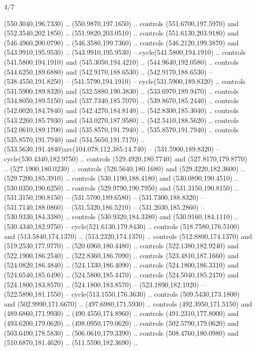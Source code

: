 \begin{flagdescription}{4/7}
\begin{scope}[shift={(0.5\flaglength,0.5\flagwidth)},scale=\flagwidth*\stretchfactor/820]
\begin{scope}[scale=1.87,xshift=-138mm,yshift=75mm]
\begin{scope}[y=0.8pt, x=0.8pt, yscale=-1, xscale=1]
\begin{scope}[fill=cd2a567]
  (550.3040,196.7330) .. (550.9870,197.1650) .. controls (551.6700,197.5970) and
  (552.3540,202.1850) .. (551.9820,203.0510) .. controls (551.6130,203.9180) and
  (546.4960,200.0790) .. (546.3580,199.7360) .. controls (546.2120,199.3870) and
  (543.9910,195.9530) .. (543.9910,195.9530) -- cycle(541.5800,194.1910) ..
  controls (541.5800,194.1910) and (545.3050,194.4210) .. (544.9640,192.0580) ..
  controls (544.6250,189.6880) and (542.9170,188.6530) .. (542.9170,188.6530) --
  (538.4550,191.8250) -- (541.5790,194.1910) -- cycle(531.5900,189.8320) ..
  controls (531.5900,189.8320) and (532.5880,190.3830) .. (533.6970,189.9470) ..
  controls (534.8050,189.5150) and (537.7340,185.7070) .. (539.8670,185.2440) ..
  controls (542.0020,184.7840) and (542.4270,184.8140) .. (542.8300,185.3040) ..
  controls (543.2260,185.7930) and (543.0270,187.9580) .. (542.5410,188.5620) ..
  controls (542.0610,189.1700) and (535.8570,191.7940) .. (535.8570,191.7940) ..
  controls (535.8570,191.7940) and (534.5650,191.7170) ..
  (533.5630,191.4840)arc(104.078:112.385:14.740) -- (531.5900,189.8320) --
  cycle(530.4340,182.9750) .. controls (529.4920,180.7740) and
  (527.8170,179.8770) .. (527.1900,180.0230) .. controls (526.5640,180.1680) and
  (529.3220,182.3600) .. (529.7200,185.3910) .. controls (530.1190,188.4180) and
  (530.0890,190.4510) .. (530.0350,190.6250) .. controls (529.9790,190.7950) and
  (531.3150,190.8150) .. (531.3150,190.8150) -- (531.5700,189.6580) --
  (531.7300,188.8320) -- (531.7140,188.0860) -- (531.5320,186.5210) --
  (531.2030,185.2860) -- (530.9330,184.3380) .. controls (530.9320,184.3380) and
  (530.9160,184.1110) .. (530.4340,182.9750) -- cycle(521.6130,179.8430) ..
  controls (518.7580,176.5100) and (513.5840,174.1370) .. (513.2320,174.1370) ..
  controls (512.8800,174.1370) and (519.2530,177.9770) .. (520.6960,180.4480) ..
  controls (522.1380,182.9240) and (522.1900,186.2540) .. (522.8360,186.7090) ..
  controls (523.4810,187.1660) and (524.0820,186.4840) .. (524.1330,186.4090) ..
  controls (524.1800,186.3310) and (524.6540,185.6490) .. (524.5800,185.4470) ..
  controls (524.5040,185.2470) and (524.1800,183.8570) .. (524.1800,183.8570) --
  (523.1890,182.1920) -- (522.5890,181.1550) -- cycle(513.1550,176.3630) ..
  controls (509.5430,173.1800) and (502.9990,171.6670) .. (497.6980,171.5930) ..
  controls (492.3950,171.5150) and (489.6860,171.9930) .. (490.4550,174.8960) ..
  controls (491.2310,177.8000) and (493.6200,179.0620) .. (498.0950,179.0620) ..
  controls (502.5790,179.0620) and (503.6490,178.5830) .. (506.0610,179.3390) ..
  controls (508.4760,180.0980) and (510.6870,181.4620) .. (511.5590,182.3690) ..

\end{scope}
\end{scope}
\end{scope}
\end{scope}
\end{flagdescription}
